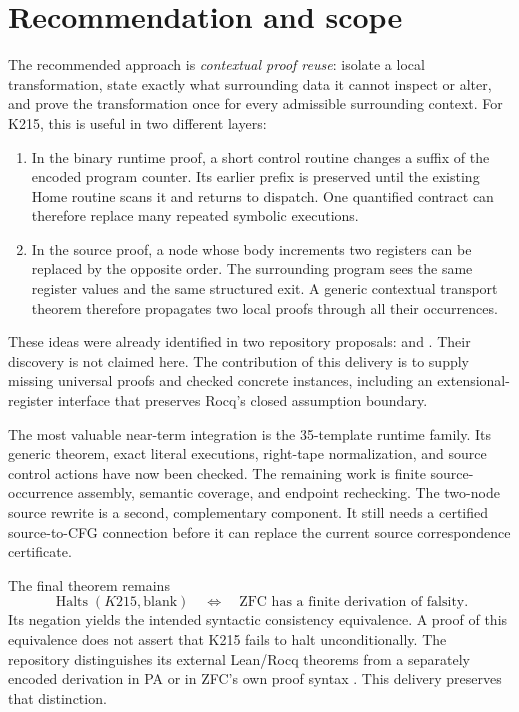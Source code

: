\documentclass[11pt,letterpaper]{article}
\theoremstyle{definition}
\newcommand{\code}[1]{\texttt{\detokenize{#1}}}
\newcommand{\Halts}{\operatorname{Halts}}
\begin{document}
\tableofcontents
\newpage

\section{Recommendation and scope}

The recommended approach is \emph{contextual proof reuse}: isolate a local
transformation, state exactly what surrounding data it cannot inspect or alter,
and prove the transformation once for every admissible surrounding context.
For K215, this is useful in two different layers:

\begin{enumerate}
\item In the binary runtime proof, a short control routine changes a suffix of
the encoded program counter. Its earlier prefix is preserved until the
existing Home routine scans it and returns to dispatch. One quantified
contract can therefore replace many repeated symbolic executions.
\item In the source proof, a node whose body increments two registers can be
replaced by the opposite order. The surrounding program sees the same register
values and the same structured exit. A generic contextual transport theorem
therefore propagates two local proofs through all their occurrences.
\end{enumerate}

These ideas were already identified in two repository proposals:
\code{round13-left-frame} \cite{leftproposal} and
\code{k215-simplification-3} \cite{cfgproposal}.
Their discovery is not claimed here.
The contribution of this delivery is to supply missing universal proofs and
checked concrete instances, including an extensional-register interface that
preserves Rocq's closed assumption boundary.

The most valuable near-term integration is the 35-template runtime family.
Its generic theorem, exact literal executions, right-tape normalization, and
source control actions have now been checked. The remaining work is finite
source-occurrence assembly, semantic coverage, and endpoint rechecking.
The two-node source rewrite is a second, complementary component. It still
needs a certified source-to-CFG connection before it can replace the current
source correspondence certificate.

The final theorem remains
\[
 \Halts(K215,\mathrm{blank})
 \quad\Longleftrightarrow\quad
 \text{ZFC has a finite derivation of falsity}.
\]
Its negation yields the intended syntactic consistency equivalence. A proof
of this equivalence does not assert that K215 fails to halt unconditionally.
The repository distinguishes its external Lean/Rocq theorems from a separately
encoded derivation in PA or in ZFC's own proof syntax \cite{verification}.
This delivery preserves that distinction.
\end{document}
